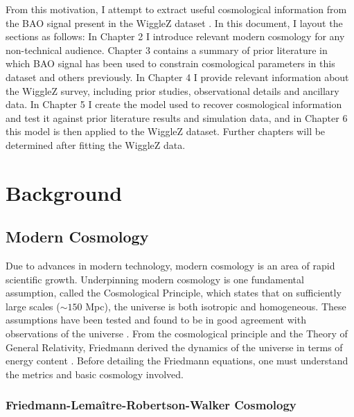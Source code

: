 \documentclass[titlesmallcaps, examinerscopy, copyrightpage]{uqthesis}
\newcommand{\green}{\color{LimeGreen}}
\begin{document}
From this motivation, I attempt to extract useful cosmological information from the BAO signal present in the WiggleZ dataset \citep[WiggleZ;][]{Drinkwater2010}. In this document, I layout the sections as follows: In Chapter 2 I introduce relevant modern cosmology for any non-technical audience. Chapter 3 contains a summary of prior literature in which BAO signal has been used to constrain cosmological parameters in this dataset and others previously. In Chapter 4 I provide relevant information about the WiggleZ survey, including prior studies, observational details and ancillary data. In Chapter 5 I create the model used to recover cosmological information and test it against prior literature results and simulation data, and in Chapter 6 this model is then applied to the WiggleZ dataset. {\green Further chapters will be determined after fitting the WiggleZ data.}







\chapter{Background}
\label{ch:back}

\section{Modern Cosmology}

Due to advances in modern technology, modern cosmology is an area of rapid scientific growth. Underpinning modern cosmology is one fundamental assumption, called the Cosmological Principle, which states that on sufficiently large scales ($\sim 150$ Mpc), the universe is both isotropic and homogeneous. These assumptions have been tested and found to be in good agreement with observations of the universe \citep{ScrimgeourDavis2012, HoggEisenstein2005, HansenBanday2004,SchwarzBacon2015,Lahav2001}. From the cosmological principle and the Theory of General Relativity, Friedmann derived the dynamics of the universe in terms of energy content \citep{RydenPeterson2010}. Before detailing the Friedmann equations, one must understand the metrics and basic cosmology involved.

\subsection{Friedmann-Lema\^itre-Robertson-Walker Cosmology} \label{sec:frw}
\end{document}
